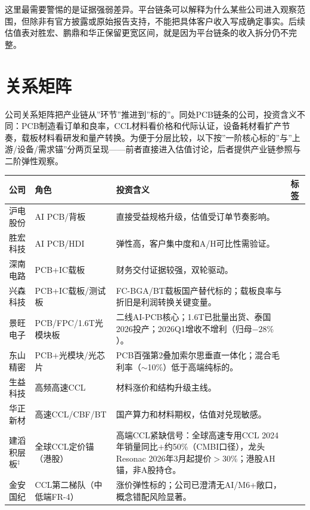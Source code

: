 这里最需要警惕的是证据强弱差异。平台链条可以解释为什么某些公司进入观察范围，但除非有官方披露或原始报告支持，不能把具体客户收入写成确定事实。后续估值表对胜宏、鹏鼎和华正保留更宽区间，就是因为平台链条的收入拆分仍不完整。

\section{关系矩阵}

公司关系矩阵把产业链从”环节”推进到”标的”。同处PCB链条的公司，投资含义不同：PCB制造看订单和良率，CCL材料看价格和代际认证，设备耗材看扩产节奏，载板材料看研发和量产转换。为便于分层比较，以下按”一阶核心标的”与”上游/设备/需求锚”分两页呈现——前者直接进入估值讨论，后者提供产业链参照与二阶弹性观察。

\begin{exhibitbox}
\small
\begin{tabularx}{\textwidth}{L{2.3cm}L{3.0cm}X L{2.5cm}}
\toprule
\textbf{公司} & \textbf{角色} & \textbf{投资含义} & \textbf{标签} \\
\midrule
沪电股份 & AI PCB/背板 & 直接受益规格升级，估值受订单节奏影响。 &  \\
胜宏科技 & AI PCB/HDI & 弹性高，客户集中度和A/H可比性需验证。 &  \\
深南电路 & PCB+IC载板 & 财务交付证据较强，双轮驱动。 &  \\
兴森科技 & PCB+IC载板/测试板 & FC-BGA/BT载板国产替代标的；载板良率与折旧是利润转换关键变量。 &  \\
景旺电子 & PCB/FPC/1.6T光模块板 & 二线AI-PCB核心；1.6T已批量出货、泰国2026投产；2026Q1增收不增利（归母$-28\%$）。 &  \\
东山精密 & PCB+光模块/光芯片 & PCB百强第2叠加索尔思垂直一体化；混合毛利率（$\sim$10\%）低于高端纯标的。 &  \\
生益科技 & 高频高速CCL & 材料涨价和结构升级主线。 &  \\
华正新材 & 高速CCL/CBF/BT & 国产算力和材料期权，估值对兑现敏感。 &  \\
建滔积层板$^\ddagger$ & 全球CCL定价锚（港股） & 高端CCL紧缺信号：全球高速专用CCL 2024年销量同比$+$约50\%（CMBI口径），龙头Resonac 2026年3月起提价$>$30\%；港股AH锚，非A股持仓。 &  \\
金安国纪 & CCL第二梯队（中低端FR-4） & 涨价弹性标的；公司已澄清无AI/M6+敞口，概念错配风险显著。 &  \\
\bottomrule
\end{tabularx}
\end{exhibitbox}

